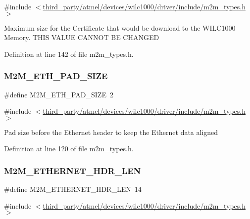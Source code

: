 {\ttfamily \#include $<$\hyperlink{m2m__types_8h}{third\+\_\+party/atmel/devices/wilc1000/driver/include/m2m\+\_\+types.\+h}$>$}

Maximum size for the Certificate that would be download to the W\+I\+L\+C1000 Memory. T\+H\+IS V\+A\+L\+UE C\+A\+N\+N\+OT BE C\+H\+A\+N\+G\+ED 

Definition at line 142 of file m2m\+\_\+types.\+h.

\mbox{\label{group__WlanDefines_ga3496dd7fbc0c97936dda2e6f9b91fa16}} 
\subsubsection{\texorpdfstring{M2\+M\+\_\+\+E\+T\+H\+\_\+\+P\+A\+D\+\_\+\+S\+I\+ZE}{M2M\_ETH\_PAD\_SIZE}}
{\footnotesize\ttfamily \#define M2\+M\+\_\+\+E\+T\+H\+\_\+\+P\+A\+D\+\_\+\+S\+I\+ZE~2}



{\ttfamily \#include $<$\hyperlink{m2m__types_8h}{third\+\_\+party/atmel/devices/wilc1000/driver/include/m2m\+\_\+types.\+h}$>$}

Pad size before the Ethernet header to keep the Ethernet data aligned 

Definition at line 120 of file m2m\+\_\+types.\+h.

\mbox{\label{group__WlanDefines_ga2e92eed1cebe5e5973b1682baf87d0a3}} 
\subsubsection{\texorpdfstring{M2\+M\+\_\+\+E\+T\+H\+E\+R\+N\+E\+T\+\_\+\+H\+D\+R\+\_\+\+L\+EN}{M2M\_ETHERNET\_HDR\_LEN}}
{\footnotesize\ttfamily \#define M2\+M\+\_\+\+E\+T\+H\+E\+R\+N\+E\+T\+\_\+\+H\+D\+R\+\_\+\+L\+EN~14}



{\ttfamily \#include $<$\hyperlink{m2m__types_8h}{third\+\_\+party/atmel/devices/wilc1000/driver/include/m2m\+\_\+types.\+h}$>$}

